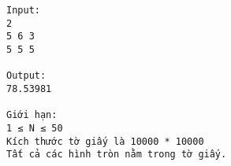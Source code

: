 \begin{verbatim}
Input:
2
5 6 3
5 5 5

Output:
78.53981

Giới hạn:
1 ≤ N ≤ 50
Kích thước tờ giấy là 10000 * 10000
Tất cả các hình tròn nằm trong tờ giấy.
\end{verbatim}